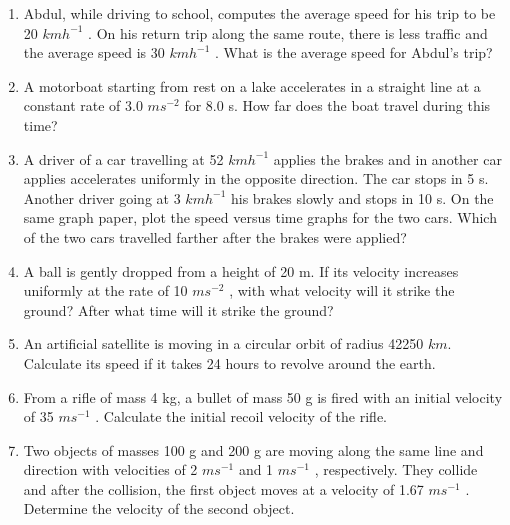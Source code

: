 \begin{enumerate}[label=\arabic*.,ref=\thesection.\theenumi]
\item  Abdul, while driving to school, computes the average speed for his trip to be 20 $km h^{-1}$
. On his return trip along the same
route, there is less traffic and the average speed is 30 $km h^{-1}$
. What is the average speed for Abdul's trip?
\item  A motorboat starting from rest on a lake accelerates in a straight line at a constant rate of 3.0 $m s^{-2}$
for 8.0 s. How far does the boat travel during this time? 
\item  A driver of a car travelling at 52 $km h^{-1}$
applies the brakes and in another car applies
accelerates uniformly in the opposite direction. The car stops in 5 s. Another driver going at 3 $km h^{-1}$
his brakes slowly and stops in 10 s. On the same graph paper, plot the speed versus time graphs for the two cars. Which of the two cars travelled farther after the brakes were applied?

\item A ball is gently dropped from a height of 20 m. If its velocity increases uniformly at the rate of 10 $m s^{-2}$
, with what velocity
will it strike the ground? After what time will it strike the ground?

\item An artificial satellite is moving in a circular orbit of radius 42250 $km$. Calculate its speed if it takes 24 hours to revolve around the earth.
\item From a rifle of mass 4 kg, a bullet of mass 50 g is fired with an initial velocity of 35 $m s^{-1}$
.
Calculate the initial recoil velocity of the rifle.
\item Two objects of masses 100 g and 200 g are moving along the same line and direction with velocities of 2 $m s^{-1}$ and 1 $m s^{-1}$ , respectively. 
They collide and after the collision, the first object moves at a velocity of 1.67 $m s^{-1}$ 
. Determine the velocity of the second object.


\end{enumerate}
